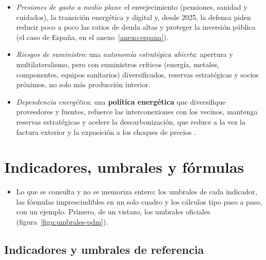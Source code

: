 \documentclass[11pt]{article}
\begin{document}
\begin{itemize}
\item \emph{Presiones de gasto a medio plazo}: el envejecimiento (pensiones, sanidad y cuidados), la transición energética y digital y, desde 2025, la defensa piden reducir poco a poco las ratios de deuda altas y proteger la inversión pública \parencite{CE2024Envejecimiento} (el caso de España, en el anexo~\ref{anexo:espana}).
\item \emph{Riesgos de suministro}: una \emph{autonomía estratégica abierta}: apertura y multilateralismo, pero con suministros críticos (energía, metales, componentes, equipos sanitarios) diversificados, reservas estratégicas y socios próximos, no solo más producción interior.
\item \emph{Dependencia energética}: una \textbf{política energética} que diversifique proveedores y fuentes, refuerce las interconexiones con los vecinos, mantenga reservas estratégicas y acelere la descarbonización, que reduce a la vez la factura exterior y la exposición a los choques de precios \parencite{CE2022REPowerEU}.
\end{itemize}

\clearpage
\appendix

\section{Indicadores, umbrales y fórmulas}\label{anexo:indicadores}

\begin{itemize}
\item Lo que se consulta y no se memoriza entero: los umbrales de cada indicador, las fórmulas imprescindibles en un solo cuadro y los cálculos tipo paso a paso, con un ejemplo. Primero, de un vistazo, los umbrales oficiales (figura~\ref{figu:umbrales-pdm}).
\end{itemize}

\begin{infografia}[H]
\centering
\caption{Los umbrales oficiales de un vistazo}\label{figu:umbrales-pdm}
\end{infografia}

\subsection{Indicadores y umbrales de referencia}\label{anexo:umbrales}
\end{document}
